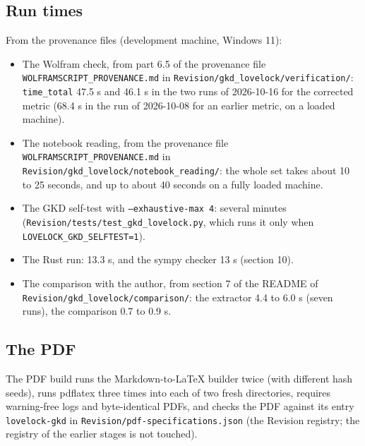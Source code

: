 \documentclass[11pt]{article}
\begin{document}
\subsection{Run times}

From the provenance files (development machine, Windows 11):

\begin{itemize}
\item The Wolfram check, from part 6.5 of the provenance file \texttt{WOLFRAMS\allowbreak{}CRIPT\_PR\allowbreak{}OVENANCE\allowbreak{}.md} in \texttt{Revision\allowbreak{}/gkd\_lov\allowbreak{}elock/ve\allowbreak{}rificati\allowbreak{}on/}: \texttt{time\_tot\allowbreak{}al} 47.5 s and 46.1 s in the two runs of 2026-10-16 for the corrected metric (68.4 s in the run of 2026-10-08 for an earlier metric, on a loaded machine).
\item The notebook reading, from the provenance file \texttt{WOLFRAMS\allowbreak{}CRIPT\_PR\allowbreak{}OVENANCE\allowbreak{}.md} in \texttt{Revision\allowbreak{}/gkd\_lov\allowbreak{}elock/no\allowbreak{}tebook\_r\allowbreak{}eading/}: the whole set takes about 10 to 25 seconds, and up to about 40 seconds on a fully loaded machine.
\item The GKD self-test with \texttt{--exhaus\allowbreak{}tive-max\allowbreak{} 4}: several minutes (\texttt{Revision\allowbreak{}/tests/t\allowbreak{}est\_gkd\_\allowbreak{}lovelock\allowbreak{}.py}, which runs it only when \texttt{LOVELOCK\allowbreak{}\_GKD\_SEL\allowbreak{}FTEST=1}).
\item The Rust \texttt{} run: 13.3 s, and the sympy checker 13 s (section 10).
\item The comparison with the author, from section 7 of the README of \texttt{Revision\allowbreak{}/gkd\_lov\allowbreak{}elock/co\allowbreak{}mparison\allowbreak{}/}: the extractor 4.4 to 6.0 s (seven runs), the comparison 0.7 to 0.9 s.
\end{itemize}

\subsection{The PDF}

The PDF build runs the Markdown-to-LaTeX builder twice (with different hash seeds), runs pdflatex three times into each of two fresh directories, requires warning-free logs and byte-identical PDFs, and checks the PDF against its entry \texttt{lovelock\allowbreak{}-gkd} in \texttt{Revision\allowbreak{}/pdf-spe\allowbreak{}cificati\allowbreak{}ons.json} (the Revision registry; the registry of the earlier stages is not touched).
\end{document}
